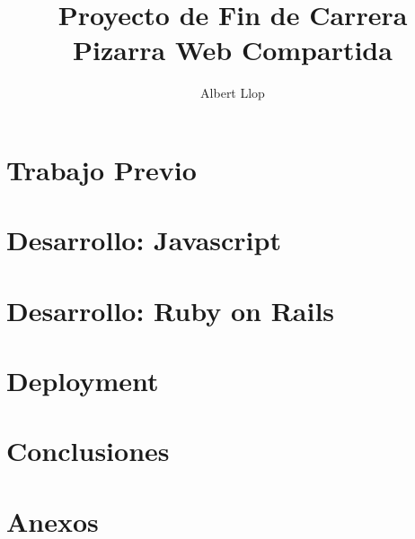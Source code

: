 \documentclass [11pt]{report}
\begin{document}
\author{Albert Llop}
\title{\Huge{\textbf{Proyecto de Fin de Carrera} \\ Pizarra Web Compartida}}
\maketitle
\newpage
\tableofcontents

\chapter{Trabajo Previo}

\newpage

\newpage

\newpage



\chapter{Desarrollo: Javascript}

\newpage

\newpage

\newpage




\chapter{Desarrollo: Ruby on Rails}

\newpage

\newpage

\newpage

\newpage

\newpage

\newpage



\chapter{Deployment}
\label{ch:deployment}

\newpage

\newpage



\chapter{Conclusiones}

\newpage

\newpage

\newpage


\chapter{Anexos}

\newpage

\end{document}
